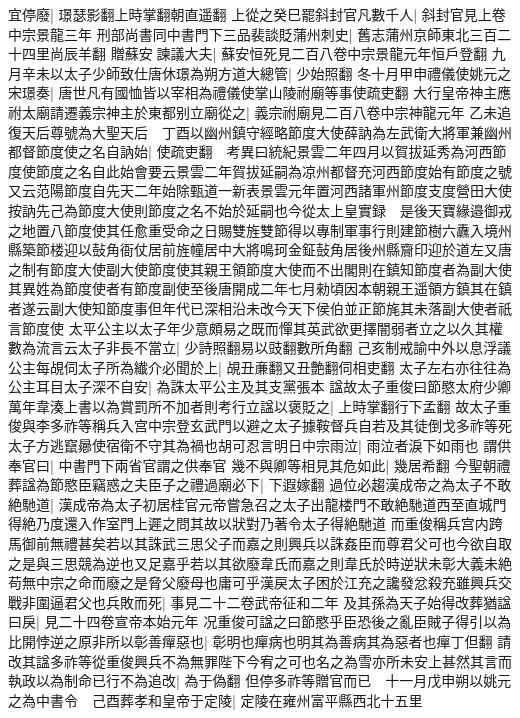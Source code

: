 宜停廢|{
	璟瑟影翻上時掌翻朝直遥翻}
上從之癸巳罷斜封官凡數千人|{
	斜封官見上卷中宗景龍三年}
刑部尚書同中書門下三品裴談貶蒲州刺史|{
	舊志蒲州京師東北三百二十四里尚辰羊翻}
贈蘇安諫議大夫|{
	蘇安恒死見二百八卷中宗景龍元年恒戶登翻}
九月辛未以太子少師致仕唐休璟為朔方道大總管|{
	少始照翻}
冬十月甲申禮儀使姚元之宋璟奏|{
	唐世凡有國恤皆以宰相為禮儀使掌山陵祔廟等事使疏吏翻}
大行皇帝神主應祔太廟請遷義宗神主於東都别立廟從之|{
	義宗祔廟見二百八卷中宗神龍元年}
乙未追復天后尊號為大聖天后　丁酉以幽州鎮守經略節度大使薛訥為左武衛大將軍兼幽州都督節度使之名自訥始|{
	使疏吏翻　考異曰統紀景雲二年四月以賀拔延秀為河西節度使節度之名自此始會要云景雲二年賀拔延嗣為凉州都督充河西節度始有節度之號又云范陽節度自先天二年始除甄道一新表景雲元年置河西諸軍州節度支度營田大使按訥先己為節度大使則節度之名不始於延嗣也今從太上皇實録　是後天寶緣邉御戎之地置八節度使其任愈重受命之日賜雙旌雙節得以專制軍事行則建節樹六纛入境州縣築節楼迎以鼔角衙仗居前旌幢居中大將鳴珂金鉦鼔角居後州縣齎印迎於道左又唐之制有節度大使副大使節度使其親王領節度大使而不出閣則在鎮知節度者為副大使其異姓為節度使者有節度副使至後唐開成二年七月勑頃因本朝親王遥領方鎮其在鎮者遂云副大使知節度事但年代已深相沿未改今天下侯伯並正節旄其未落副大使者祇言節度使}
太平公主以太子年少意頗易之既而憚其英武欲更擇闇弱者立之以久其權數為流言云太子非長不當立|{
	少詩照翻易以豉翻數所角翻}
己亥制戒諭中外以息浮議公主每覘伺太子所為纎介必聞於上|{
	覘丑亷翻又丑艶翻伺相吏翻}
太子左右亦往往為公主耳目太子深不自安|{
	為誅太平公主及其支黨張本}
諡故太子重俊曰節愍太府少卿萬年韋湊上書以為賞罰所不加者則考行立諡以褒貶之|{
	上時掌翻行下孟翻}
故太子重俊與李多祚等稱兵入宫中宗登玄武門以避之太子據鞍督兵自若及其徒倒戈多祚等死太子方逃竄曏使宿衛不守其為禍也胡可忍言明日中宗雨泣|{
	雨泣者淚下如雨也}
謂供奉官曰|{
	中書門下兩省官謂之供奉官}
幾不與卿等相見其危如此|{
	幾居希翻}
今聖朝禮葬諡為節愍臣竊惑之夫臣子之禮過廟必下|{
	下遐嫁翻}
過位必趨漢成帝之為太子不敢絶馳道|{
	漢成帝為太子初居桂官元帝嘗急召之太子出龍楼門不敢絶馳道西至直城門得絶乃度還入作室門上遲之問其故以狀對乃著令太子得絶馳道}
而重俊稱兵宫内跨馬御前無禮甚矣若以其誅武三思父子而嘉之則興兵以誅姦臣而尊君父可也今欲自取之是與三思競為逆也又足嘉乎若以其欲廢韋氏而嘉之則韋氏於時逆狀未彰大義未絶苟無中宗之命而廢之是脅父廢母也庸可乎漢戻太子困於江充之讒發忿殺充雖興兵交戰非圍逼君父也兵敗而死|{
	事見二十二卷武帝征和二年}
及其孫為天子始得改葬猶諡曰戾|{
	見二十四卷宣帝本始元年}
况重俊可諡之曰節愍乎臣恐後之亂臣賊子得引以為比開悖逆之原非所以彰善癉惡也|{
	彰明也癉病也明其為善病其為惡者也癉丁但翻}
請改其諡多祚等從重俊興兵不為無罪陛下今宥之可也名之為雪亦所未安上甚然其言而執政以為制命已行不為追改|{
	為于偽翻}
但停多祚等贈官而已　十一月戊申朔以姚元之為中書令　己酉葬孝和皇帝于定陵|{
	定陵在雍州富平縣西北十五里}
